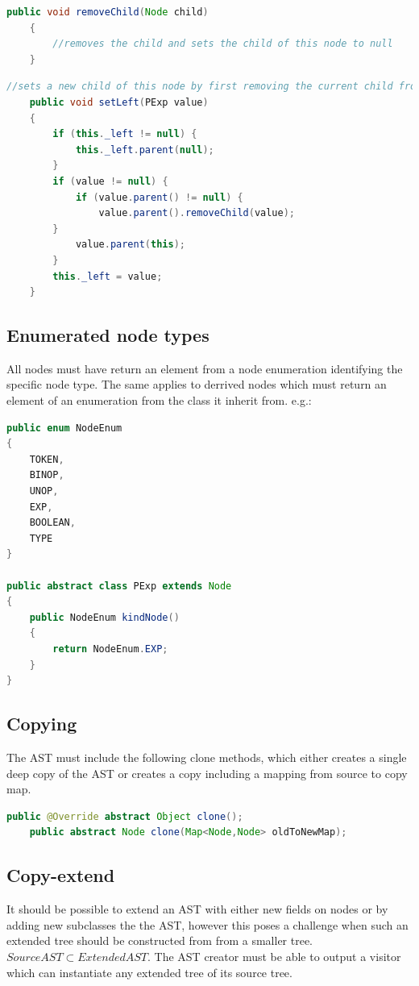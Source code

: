 \documentclass{overturerep}
\begin{document}
\begin{lstlisting}[language=java]
	public void removeChild(Node child)
	{
		//removes the child and sets the child of this node to null
	}
\end{lstlisting}

\begin{lstlisting}[language=java]
//sets a new child of this node by first removing the current child from this node then removing the new one from its old parent and adding it	
	public void setLeft(PExp value)
	{
		if (this._left != null) {
			this._left.parent(null);
		}
		if (value != null) {
			if (value.parent() != null) {
				value.parent().removeChild(value);
		}
			value.parent(this);
		}
		this._left = value;
	}
\end{lstlisting}

\subsection{Enumerated node types}
All nodes must have return an element from a node enumeration identifying the specific node type. The same applies to derrived nodes which must return an element of an enumeration from the class it inherit from. e.g.:

\begin{lstlisting}[language=java]
public enum NodeEnum
{
	TOKEN,
	BINOP,
	UNOP,
	EXP,
	BOOLEAN,
	TYPE
}

public abstract class PExp extends Node
{
	public NodeEnum kindNode()
	{
		return NodeEnum.EXP;
	}
}
\end{lstlisting}

\subsection{Copying}
The AST must include the following clone methods, which either creates a single deep copy of the AST or creates a copy including a mapping from source to copy map.
\begin{lstlisting}[language=java]
	public @Override abstract Object clone();
	public abstract Node clone(Map<Node,Node> oldToNewMap);
\end{lstlisting}

\subsection{Copy-extend}
It should be possible to extend an AST with either new fields on nodes or by adding new subclasses the the AST, however this poses a challenge when such an extended tree should be constructed from from a smaller tree. $SourceAST \subset ExtendedAST$. The AST creator must be able to output a visitor which can instantiate any extended tree of its source tree.
\end{document}
